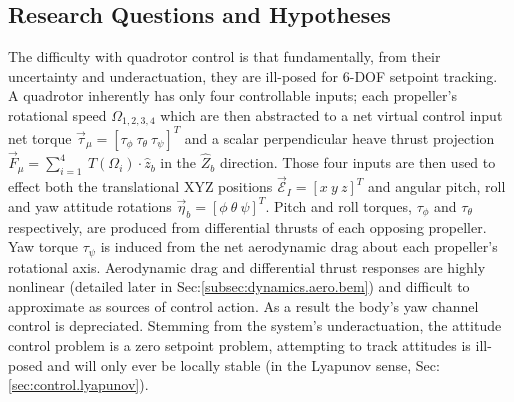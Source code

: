 \subsection{Research Questions and Hypotheses}
\label{subsec:intro.foreword.hypotheses}
The difficulty with quadrotor control is that fundamentally, from their uncertainty and underactuation, they are ill-posed for 6-DOF setpoint tracking. A quadrotor inherently has only four controllable inputs; each propeller's rotational speed $\Omega_{1,2,3,4}$ which are then abstracted to a net virtual control input net torque $\vec{\tau}_\mu=[\tau_{\phi}~\tau_{\theta}~\tau_{\psi}]^T$ and a scalar perpendicular heave thrust projection $\vec{F}_\mu=\sum_{i=1}^{4}~T(\Omega_i)\cdot\hat{z}_b$ in the $\hat{Z}_b$ direction. Those four inputs are then used to effect both the translational XYZ positions $\vec{\mathcal{E}}_I=[x~y~z]^T$ and angular pitch, roll and yaw attitude rotations $\vec{\eta}_b=[\phi~\theta~\psi]^T$. Pitch and roll torques, $\tau_{\phi}$ and $\tau_{\theta}$ respectively, are produced from differential thrusts of each opposing propeller. Yaw torque $\tau_{\psi}$ is induced from the net aerodynamic drag about each propeller's rotational axis. Aerodynamic drag and differential thrust responses are highly nonlinear (detailed later in Sec:\ref{subsec:dynamics.aero.bem}) and difficult to approximate as sources of control action. As a result the body's yaw channel control is depreciated. Stemming from the system's underactuation, the attitude control problem is a zero setpoint problem, attempting to track attitudes is ill-posed and will only ever be locally stable (in the Lyapunov sense, Sec:\ref{sec:control.lyapunov}).
\par
